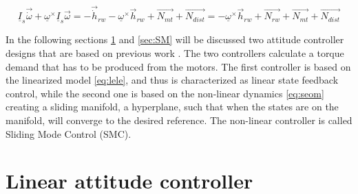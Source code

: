 		\begin{equation}
		\underline{I}_{s}\vec{\dot{\omega}} + \underline{\omega}^\times\underline{I}_{s}\vec{\omega} = -\vec{\dot{h}}_{rw} -  \underline{\omega}^\times \vec{{h}}_{rw} + \vec{N_{mt}}  + \vec{N_{dist}} =  -  \underline{\omega}^\times \vec{{h}}_{rw} + \vec{N_{rw}} + \vec{N_{mt}}  + \vec{N_{dist}} 
		\end{equation}
		





In the following sections \ref{sec:LC} and \ref{sec:SM}  will be discussed two attitude controller designs that are based on previous work \cite{PrevPro}. The two controllers calculate a torque demand that has to be produced from the motors. The first controller is based on the linearized model \eqref{eq:lele}, and thus is characterized as linear state feedback control, while the second one is based on the non-linear dynamics \eqref{eq:seom} creating a sliding manifold, a hyperplane, such that when the states are on the manifold, will converge to the desired reference. The non-linear controller is called Sliding Mode Control (SMC).

\section{Linear attitude controller} \label{sec:LC}

